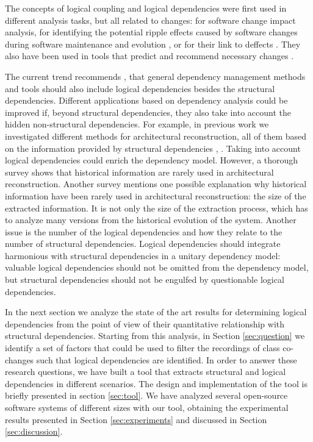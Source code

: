 \documentclass[a4paper,twoside]{article}
\begin{document}
The concepts of logical coupling and logical dependencies were first used in different analysis tasks, but all related to changes: for software change impact analysis, for identifying the potential ripple effects caused by software changes during software maintenance and evolution \cite{DBLP:conf/issre/OlivaG15}, or for their link to deffects \cite{wiese}.  They also have been used in tools that predict and recommend necessary changes \cite{Zimmermann:2004:MVH:998675.999460}. 

The current trend recommends \cite{Oliva:2011:ISL:2067853.2068086}, \cite{DBLP:journals/jss/AjienkaC17} that general dependency management methods and tools should also include logical dependencies besides the structural dependencies. Different applications based on dependency analysis could be improved if, beyond structural dependencies, they also take into account the hidden non-structural dependencies. For example, in previous work   we investigated different methods for architectural reconstruction,  all of them based on the information provided by structural dependencies \cite{SoraConti}, \cite{PagerankENASE}. Taking into account logical dependencies could enrich the dependency model. However, a thorough survey \cite{sar} shows that historical information are rarely used in architectural reconstruction. Another survey \cite{Shtern:2012:CMS:2332427.2332428} mentions one possible explanation why historical information have been rarely used in architectural reconstruction: the size of the extracted information. It is not only the size of the extraction process, which has to analyze many versions from the historical evolution of the system. Another issue is the number of the logical dependencies and how they relate to the number of structural dependencies. Logical dependencies should integrate harmonious with structural dependencies in a unitary dependency model: valuable logical dependencies should not be omitted from the dependency model, but structural dependencies should not be engulfed by questionable logical dependencies.  

In the next section we analyze the state of the art results for determining logical dependencies from the point of view of their quantitative relationship with structural dependencies. Starting from this analysis, in Section \ref{sec:question} we identify a set of factors that could be used to filter the recordings of class co-changes such that logical dependencies are identified. In order to answer these research questions, we have built a tool that extracts structural and logical dependencies in different scenarios. The design and implementation of the tool is briefly presented in section \ref{sec:tool}. We have analyzed several open-source software systems of different sizes with our tool, obtaining the experimental results presented in Section \ref{sec:experiments} and discussed in Section \ref{sec:discussion}.
 
\end{document}
